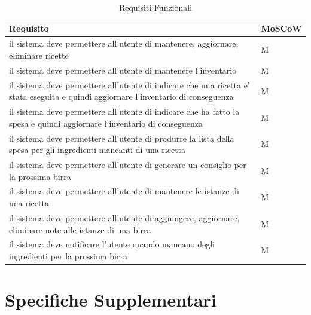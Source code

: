 \documentclass[a4paper,12pt]{report}
\begin{document}
    		\begin{table}[!h]
      			\renewcommand{\arraystretch}{1.2}
      			\begin{tabular}{p{}|p{}} 
        				\textbf{Requisito}  & \textbf{MoSCoW} \\
    				\hline
                                  il sistema deve permettere all'utente di mantenere, aggiornare, eliminare ricette & M \\
                                  il sistema deve permettere all'utente di mantenere l'inventario & M \\
                                  il sistema deve permettere all'utente di indicare che una ricetta e' stata eseguita e quindi aggiornare l'inventario di conseguenza & M \\
                                  il sistema deve permettere all'utente di indicare che ha fatto la spesa e quindi aggiornare l'inventario di conseguenza & M \\
                                  il sistema deve permettere all'utente di produrre la lista della spesa per gli ingredienti mancanti di una ricetta & M \\
                                  il sistema deve permettere all'utente di generare un consiglio per la prossima birra & M \\
                                  il sistema deve permettere all'utente di mantenere le istanze di una ricetta & M \\
                                  il sistema deve permettere all'utente di aggiungere, aggiornare, eliminare note alle istanze di una birra & M \\
                                  il sistema deve notificare l'utente quando mancano degli ingredienti per la prossima birra & M \\
        			\end{tabular}
        			\caption{Requisiti Funzionali}
      			\label{tab:Requisiti Funzionali}
    		\end{table}
	
	
	
	\section{Specifiche Supplementari}
	
\end{document}
